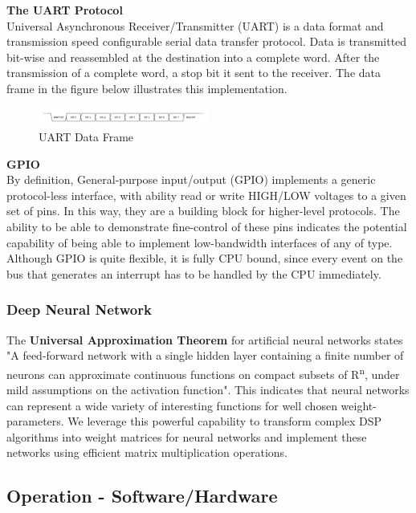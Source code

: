 \textbf{The UART Protocol} \\
Universal Asynchronous Receiver/Transmitter (UART) is a data format and transmission speed configurable serial data transfer protocol. Data is transmitted bit-wise and reassembled at the destination into a complete word. After the transmission of a complete word, a stop bit it sent to the receiver. The data frame in the figure below illustrates this implementation.
\begin{figure}[h!]
  \caption{UART Data Frame}
  \includegraphics[width=0.5\textwidth]{images/uart.png}
\end{figure}

\textbf{GPIO}\\
By definition, General-purpose input/output (GPIO) implements a generic protocol-less interface, with ability read or write HIGH/LOW voltages to a given set of pins. In this way, they are a building block for higher-level protocols. The ability to be able to demonstrate fine-control of these pins indicates the potential capability of being able to implement low-bandwidth interfaces of any of type. Although GPIO is quite flexible, it is fully CPU bound, since every event on the bus that generates an interrupt has to be handled by the CPU immediately.\\

\subsubsection{Deep Neural Network}
The \textbf{Universal Approximation Theorem}\cite{ufa} for artificial neural networks states "A feed-forward network with a single hidden layer containing a finite number of neurons can approximate continuous functions on compact subsets of R\textsuperscript{n}, under mild assumptions on the activation function". This indicates that neural networks can represent a wide variety of interesting functions for well chosen weight-parameters. We leverage this powerful capability to transform complex DSP algorithms into weight matrices for neural networks and implement these networks using efficient matrix multiplication operations.

\subsection{Operation - Software/Hardware}

